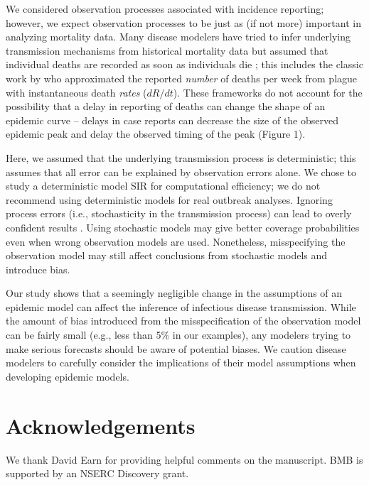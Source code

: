 \documentclass[12pt]{article}\usepackage[]{graphicx}\usepackage[]{color}
\begin{document}
We considered observation processes associated with incidence 
reporting; however, we expect observation processes to be just as 
(if not more) important in analyzing mortality data. Many disease modelers have
tried to infer underlying transmission mechanisms from historical mortality 
data but assumed that individual deaths are recorded as soon as individuals die 
\citep{he2013inferring, didelot2017model, dean2018human}; this includes the classic work by
\cite{kermack1927contribution} who approximated the reported \emph{number} of
deaths per week from plague with instantaneous death \emph{rates} ($dR/dt$).
These frameworks do not account for the possibility 
that a delay in reporting of deaths can
change the shape of an epidemic curve -- delays in case reports can decrease
the size of the observed epidemic peak and delay the observed timing of the peak (Figure 1). 

Here, we assumed that the underlying transmission process is deterministic; this 
assumes that all error can be explained by observation errors alone. 
We chose to study a deterministic model SIR for computational efficiency; 
we do not recommend using deterministic models for real outbreak analyses.
Ignoring process errors (i.e., stochasticity in the transmission process) can lead to
overly confident results \citep{king2015avoidable}. Using stochastic models may
give better coverage probabilities even when wrong observation models are used.
Nonetheless, misspecifying the observation model may still affect conclusions from 
stochastic models and introduce bias.

Our study shows that a seemingly negligible change in the assumptions of an epidemic
model can affect the inference of infectious disease transmission.
While the amount of bias introduced from the misspecification of the observation
model can be fairly small (e.g., less than 5\% in our examples), any modelers
trying to make serious forecasts should be aware of potential biases.
We caution disease modelers to carefully consider the implications of their model assumptions when developing epidemic models.

\section*{Acknowledgements}

We thank David Earn for providing helpful comments on the manuscript. BMB is supported by an NSERC Discovery grant.


\end{document}
